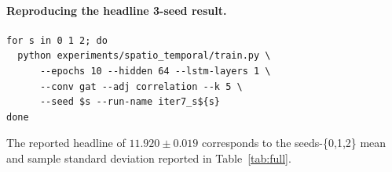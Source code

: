 \documentclass{article}
\begin{document}
\paragraph{Reproducing the headline 3-seed result.}
\begin{verbatim}
for s in 0 1 2; do
  python experiments/spatio_temporal/train.py \
      --epochs 10 --hidden 64 --lstm-layers 1 \
      --conv gat --adj correlation --k 5 \
      --seed $s --run-name iter7_s${s}
done
\end{verbatim}

The reported headline of $11.920 \pm 0.019$ corresponds to the seeds-\{0,1,2\} mean and sample standard deviation reported in Table~\ref{tab:full}.
\end{document}
